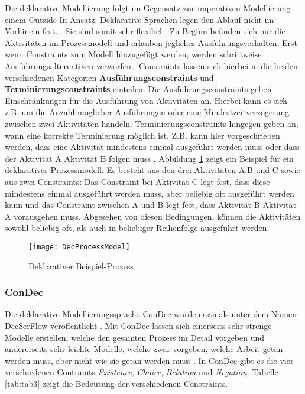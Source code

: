  Die deklarative Modellierung folgt im Gegensatz zur imperativen Modellierung einem \grqq Outside-In-Ansatz\grqq  \cite{lichtenegger2012}. Deklarative Sprachen legen den Ablauf nicht im Vorhinein fest. \cite{pichler2012}. Sie sind somit sehr flexibel \cite{reichert2012}. Zu Beginn befinden sich nur die Aktivitäten im Prozessmodell und erlauben jegliches Ausführungsverhalten. Erst wenn Constraints zum Modell hinzugefügt werden, werden schrittweise Ausführungsalternativen verworfen \cite{pichler2012}. Constraints lassen sich hierbei in die beiden verschiedenen Kategorien \textbf{Ausführungsconstraints} und \textbf{Terminierungsconstraints} einteilen. Die Ausführungsconstraints geben Einschränkungen für die Ausführung von Aktivitäten an. Hierbei kann es sich z.B. um die Anzahl möglicher Ausführungen oder eine Mindestzeitverzögerung zwischen zwei Aktivitäten handeln. Terminierungsconstraints hingegen geben an, wann eine korrekte Terminierung möglich ist. Z.B. kann hier vorgeschrieben werden, dass eine Aktivität mindestens einmal ausgeführt werden muss oder dass der Aktivität A Aktivität B folgen muss \cite{reichert2012}.  Abbildung \ref{fig:Dec} zeigt ein Beispiel für ein deklaratives Prozessmodell. Es besteht aus den drei Aktivitäten A,B und C sowie aus zwei Constraints: Das Constraint bei Aktivität C legt fest, dass diese mindestens einmal ausgeführt werden muss, aber beliebig oft ausgeführt werden kann und das Constraint zwischen A und B legt fest, dass Aktivität B Aktivität A vorausgehen muss. Abgesehen von diesen Bedingungen, können die Aktivitäten sowohl beliebig oft, als auch in beliebiger Reihenfolge ausgeführt werden.

\begin{figure}[H]
\begin{center}
  \texttt{[image: DecProcessModel]} %
  \caption{Deklarativer Beispiel-Prozess}
  \label{fig:Dec}
\end{center}
\end{figure} 

\subsubsection{ConDec}

Die deklarative Modellierungssprache ConDec wurde erstmals unter dem Namen DecSerFlow veröffentlicht \cite{fahland2010}. Mit ConDec lassen sich einerseits sehr strenge Modelle erstellen, welche den gesamten Prozess im Detail vorgeben und andererseits sehr leichte Modelle, welche zwar vorgeben, welche Arbeit getan werden muss, aber nicht wie sie getan werden muss \cite{pesic2006}. \newline
In ConDec gibt es die vier verschiedenen Contraints \textit{Existence}, \textit{Choice}, \textit{Relation} und \textit{Negation}. Tabelle \ref{tab:tab3} zeigt die Bedeutung der verschiedenen Constraints. \newline


